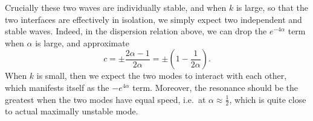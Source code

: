 \documentclass[a4paper]{article}
\begin{document}
Crucially these two waves are individually stable, and when $k$ is large, so that the two interfaces are effectively in isolation, we simply expect two independent and stable waves. Indeed, in the dispersion relation above, we can drop the $e^{-4\alpha}$ term when $\alpha$ is large, and approximate
\[
  c = \pm \frac{2\alpha - 1}{2\alpha} = \pm \left(1 - \frac{1}{2\alpha}\right).
\]
When $k$ is small, then we expect the two modes to interact with each other, which manifests itself as the $-e^{4\alpha}$ term. Moreover, the resonance should be the greatest when the two modes have equal speed, i.e.\ at $\alpha \approx \frac{1}{2}$, which is quite close to actual maximally unstable mode.
%
%
%
%
%
%
%
\end{document}
